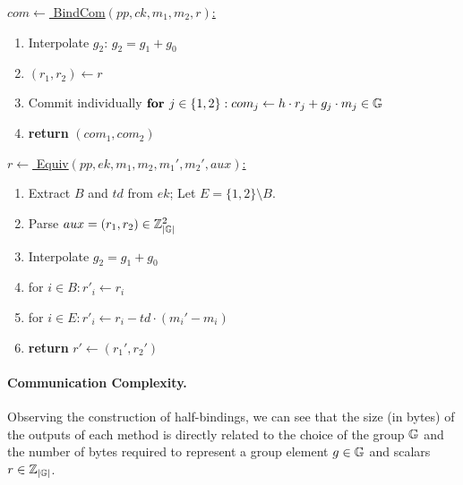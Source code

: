\begin{breakablefig}
    \underline{$com \leftarrow$ BindCom$(pp,ck, m_1,m_2, r)$:}
    \begin{enumerate}
      \item Interpolate $g_2$: $g_2 = g_1 + g_0$
      \item $(r_1, r_2) \leftarrow r$
      \item Commit individually $\textbf{for } j \in \{1,2\}: com_j \leftarrow h\cdot r_j + g_j \cdot m_j \in \mathbb{G}$
      \item \textbf{return} $(com_1,com_2)$
    \end{enumerate}

    \underline{$r \leftarrow$ Equiv$(pp, ek, m_1, m_2, m_1', m_2', aux)$:}
    \begin{enumerate}
      \item Extract $B$ and $td$ from $ek$; Let $E = \{1,2\} \setminus B$.
      \item Parse $aux = (r_1, r_2) \in \mathbb{Z}_{|\mathbb{G}|}^2$
      \item Interpolate $g_2 = g_1 + g_0$
      \item for $i \in B: r'_i \leftarrow r_i$
      \item for $i \in E: r'_i \leftarrow r_i - td \cdot (m_i' - m_i)$
      \item \textbf{return} $r' \leftarrow (r_1', r_2')$
    \end{enumerate}
  \end{breakablefig}

  \paragraph*{Communication Complexity.} Observing the construction of half-bindings, we can see that the size (in bytes) of the outputs of each method 
  is directly related to the choice of the group $\mathbb{G}$ and the number of bytes required to represent a group element $g \in \mathbb{G}$ and scalars $r \in \mathbb{Z}_{|\mathbb{G}|}$. 
  

